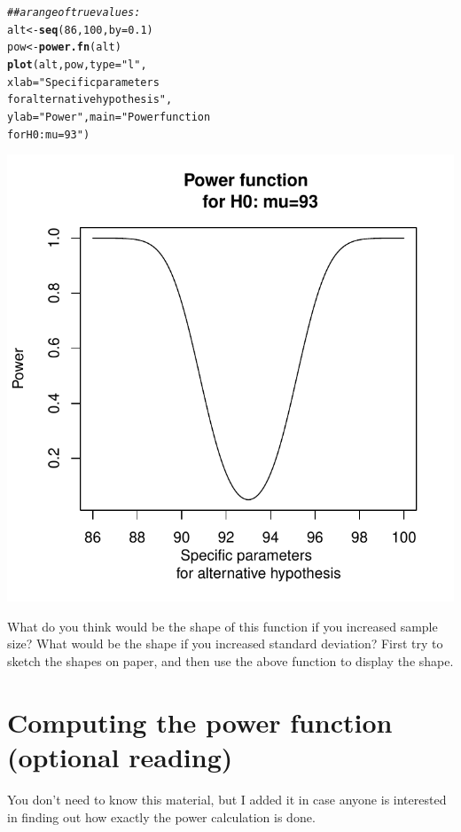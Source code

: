 \documentclass[12pt]{book}\usepackage[]{graphicx}\usepackage[]{color}
\makeatletter
\def\maxwidth{ %
  \ifdim\Gin@nat@width>\linewidth
    \linewidth
  \else
    \Gin@nat@width
  \fi
}
\newcommand{\hlnum}[1]{\textcolor[rgb]{0.686,0.059,0.569}{#1}}%
\newcommand{\hlstr}[1]{\textcolor[rgb]{0.192,0.494,0.8}{#1}}%
\newcommand{\hlcom}[1]{\textcolor[rgb]{0.678,0.584,0.686}{\textit{#1}}}%
\newcommand{\hlstd}[1]{\textcolor[rgb]{0.345,0.345,0.345}{#1}}%
\newcommand{\hlkwb}[1]{\textcolor[rgb]{0.69,0.353,0.396}{#1}}%
\newcommand{\hlkwc}[1]{\textcolor[rgb]{0.333,0.667,0.333}{#1}}%
\newcommand{\hlkwd}[1]{\textcolor[rgb]{0.737,0.353,0.396}{\textbf{#1}}}%
\newenvironment{kframe}{%
 \def\at@end@of@kframe{}%
 \ifinner\ifhmode%
  \def\at@end@of@kframe{\end{minipage}}%
  \begin{minipage}{\columnwidth}%
 \fi\fi%
 \def\FrameCommand##1{\hskip\@totalleftmargin \hskip-\fboxsep
 \colorbox{shadecolor}{##1}\hskip-\fboxsep
     \hskip-\linewidth \hskip-\@totalleftmargin \hskip\columnwidth}%
 \MakeFramed {\advance\hsize-\width
   \@totalleftmargin\z@ \linewidth\hsize
   \@setminipage}}%
 {\par\unskip\endMakeFramed%
 \at@end@of@kframe}
\newenvironment{knitrout}{}{} %
\makeatother
\begin{document}
\begin{knitrout}
\begin{kframe}
\begin{alltt}
\hlcom{## a range of true values:	}
\hlstd{alt}\hlkwb{<-}\hlkwd{seq}\hlstd{(}\hlnum{86}\hlstd{,}\hlnum{100}\hlstd{,}\hlkwc{by}\hlstd{=}\hlnum{0.1}\hlstd{)}
\hlstd{pow}\hlkwb{<-}\hlkwd{power.fn}\hlstd{(alt)}
\hlkwd{plot}\hlstd{(alt,pow,}\hlkwc{type}\hlstd{=}\hlstr{"l"}\hlstd{,}
\hlkwc{xlab}\hlstd{=}\hlstr{"Specific parameters 
     for alternative hypothesis"}\hlstd{,}
     \hlkwc{ylab}\hlstd{=}\hlstr{"Power"}\hlstd{,}\hlkwc{main}\hlstd{=}\hlstr{"Power function 
     for H0: mu=93"}\hlstd{)}
\end{alltt}
\end{kframe}
\includegraphics[width=\maxwidth]{figure/unnamed-chunk-68-1} 

\end{knitrout}

What do you think would be the shape of this function if you increased sample size? What would be the shape if you increased standard deviation?
First try to sketch the shapes on paper, and then use the above function to display the shape.

\section{Computing the power function (optional reading)}

You don't need to know this material, but I added it in case anyone is interested in finding out how exactly the power calculation is done.
\end{document}
